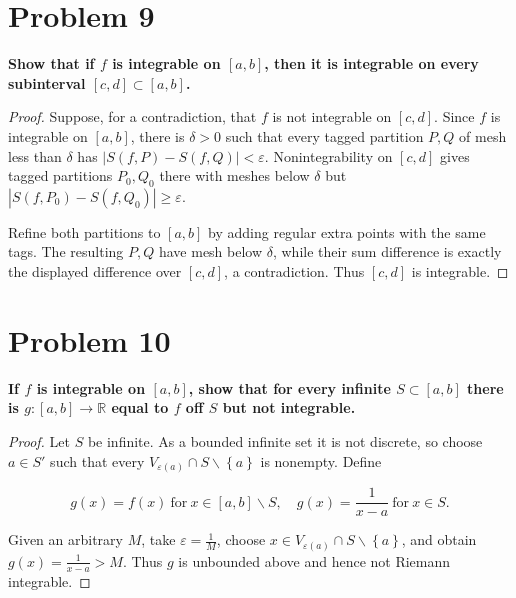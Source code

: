\section{Problem 9}

\textbf{Show that if \(f\) is integrable on \(\left\lbrack {a,b} \right\rbrack\), then it is integrable on every subinterval \(\left\lbrack {c,d} \right\rbrack \subset \left\lbrack {a,b} \right\rbrack\).}

\begin{proof}

Suppose, for a contradiction, that \(f\) is not integrable on \(\left\lbrack {c,d} \right\rbrack\). Since \(f\) is integrable on \(\left\lbrack {a,b} \right\rbrack\), there is \(\delta > 0\) such that every tagged partition \(P,Q\) of mesh less than \(\delta\) has \(\left| {S\left( {f,P} \right) - S\left( {f,Q} \right)} \right| < \varepsilon\). Nonintegrability on \(\left\lbrack {c,d} \right\rbrack\) gives tagged partitions \(P_{0},Q_{0}\) there with meshes below \(\delta\) but \(\left| {S\left( {f,P_{0}} \right) - S\left( {f,Q_{0}} \right)} \right| \geq \varepsilon\).

Refine both partitions to \(\left\lbrack {a,b} \right\rbrack\) by adding regular extra points with the same tags. The resulting \(P,Q\) have mesh below \(\delta\), while their sum difference is exactly the displayed difference over \(\left\lbrack {c,d} \right\rbrack\), a contradiction. Thus \(\left\lbrack {c,d} \right\rbrack\) is integrable.

\end{proof}

\section{Problem 10}

\textbf{If \(f\) is integrable on \(\left\lbrack {a,b} \right\rbrack\), show that for every infinite \(S \subset \left\lbrack {a,b} \right\rbrack\) there is \(g:\left\lbrack {a,b} \right\rbrack\rightarrow\mathbb{R}\) equal to \(f\) off \(S\) but not integrable.}

\begin{proof}

Let \(S\) be infinite. As a bounded infinite set it is not discrete, so choose \(a \in S'\) such that every \(V_{\varepsilon{(a)}} \cap S \smallsetminus \left\{ a \right\}\) is nonempty. Define

\[g(x) = f(x)\ \text{for}\ x \in \left\lbrack {a,b} \right\rbrack \smallsetminus S,\quad g(x) = \frac{1}{x - a}\ \text{for}\ x \in S.\]

Given an arbitrary \(M\), take \(\varepsilon = \frac{1}{M}\), choose \(x \in V_{\varepsilon{(a)}} \cap S \smallsetminus \left\{ a \right\}\), and obtain \(g(x) = \frac{1}{x - a} > M\). Thus \(g\) is unbounded above and hence not Riemann integrable.

\end{proof}

